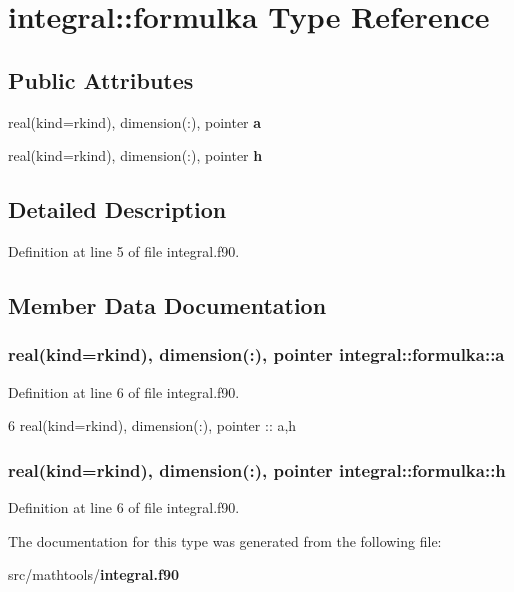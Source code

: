 \section{integral\+:\+:formulka Type Reference}
\label{structintegral_1_1formulka}
\subsection*{Public Attributes}
\begin{DoxyCompactItemize}
\item 
real(kind=rkind), dimension(\+:), pointer {\bf a}
\item 
real(kind=rkind), dimension(\+:), pointer {\bf h}
\end{DoxyCompactItemize}


\subsection{Detailed Description}


Definition at line 5 of file integral.\+f90.



\subsection{Member Data Documentation}
\subsubsection[{a}]{\setlength{\rightskip}{0pt plus 5cm}real(kind=rkind), dimension(\+:), pointer integral\+::formulka\+::a}\label{structintegral_1_1formulka_aa079ccb433b98fb576cb1b5af740174b}


Definition at line 6 of file integral.\+f90.


\begin{DoxyCode}
6     \textcolor{keywordtype}{real(kind=rkind)}, \textcolor{keywordtype}{dimension(:)}, \textcolor{keywordtype}{pointer} :: a,h
\end{DoxyCode}
\subsubsection[{h}]{\setlength{\rightskip}{0pt plus 5cm}real(kind=rkind), dimension(\+:), pointer integral\+::formulka\+::h}\label{structintegral_1_1formulka_aa83b4eab05b4c33b00bbf635b51d3c41}


Definition at line 6 of file integral.\+f90.



The documentation for this type was generated from the following file\+:\begin{DoxyCompactItemize}
\item 
src/mathtools/{\bf integral.\+f90}\end{DoxyCompactItemize}
